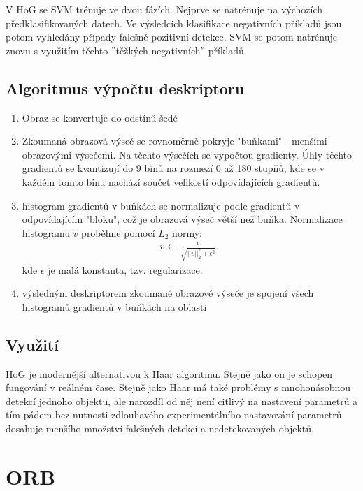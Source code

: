 	V HoG se SVM trénuje ve dvou fázích. Nejprve se natrénuje na výchozích předklasifikovaných datech. Ve výsledcích klasifikace negativních příkladů jsou potom vyhledány případy falešně pozitivní detekce. SVM se potom natrénuje znovu s využitím těchto ''těžkých negativních'' příkladů.
	
	\subsection{Algoritmus výpočtu deskriptoru}
	
	\begin{enumerate}
		\item Obraz se konvertuje do odstínů šedé
		\item Zkoumaná obrazová výseč se rovnoměrně pokryje "buňkami" - menšími obrazovými výsečemi. Na těchto výsečích se vypočtou gradienty. Úhly těchto gradientů se kvantizují do 9 binů na rozmezí 0 až 180 stupňů, kde se v každém tomto binu nachází součet velikostí odpovídajících gradientů.
		\item histogram gradientů v buňkách se normalizuje podle gradientů v odpovídajícím "bloku", což je obrazová výseč větší než buňka. Normalizace histogramu $v$ proběhne pomocí $L_2$ normy:
		\begin{align}
		v \leftarrow \frac{v}{\sqrt{||v||_2^2 + \epsilon^2}},
		\end{align}
		kde $\epsilon$ je malá konstanta, tzv. regularizace.
		\item výsledným deskriptorem zkoumané obrazové výseče je spojení všech histogramů gradientů v buňkách na oblasti
	\end{enumerate}

	\subsection{Využití}
	
	HoG je modernější alternativou k Haar algoritmu. Stejně jako on je schopen fungování v reálném čase. Stejně jako Haar má také problémy s mnohonásobnou detekcí jednoho objektu, ale narozdíl od něj není citlivý na nastavení parametrů a tím pádem bez nutnosti zdlouhavého experimentálního nastavování parametrů dosahuje menšího množství falešných detekcí a nedetekovaných objektů.

\section{ORB}

